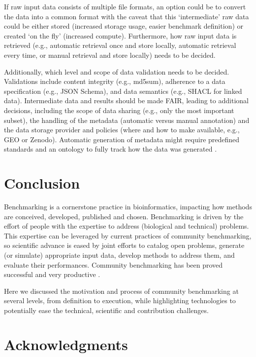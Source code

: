 \documentclass[11pt]{article}
\begin{document}
If raw input data consists of multiple file formats, an option could be to convert the data into a common format with the caveat that this `intermediate' raw data could be either stored (increased storage usage, easier benchmark definition) or created `on the fly' (increased compute). Furthermore, how raw input data is retrieved (e.g., automatic retrieval once and store locally, automatic retrieval every time, or manual retrieval and store locally) needs to be decided.

Additionally, which level and scope of data validation needs to be decided. Validations include content integrity (e.g., md5sum), adherence to a data specification (e.g., JSON Schema), and data semantics (e.g., SHACL for linked data). Intermediate data and results should be made FAIR, leading to additional decisions, including the scope of data sharing (e.g., only the most important subset), the handling of the metadata (automatic versus manual annotation) and the data storage provider and policies (where and how to make available, e.g., GEO or Zenodo). Automatic generation of metadata might require predefined standards and an ontology to fully track how the data was generated \cite{LeboUnknown-om}. 


\section*{Conclusion}
\label{sec:conclusion}

Benchmarking is a cornerstone practice in bioinformatics, impacting how methods are conceived, developed, published and chosen. Benchmarking is driven by the effort of people with the expertise to address (biological and technical) problems. This expertise can be leveraged by current practices of community benchmarking, so scientific advance is eased by joint efforts to catalog open problems, generate (or simulate) appropriate input data, develop methods to address them, and evaluate their performances. Community benchmarking has been proved successful and very productive \cite{Moult2005-ne,Capella-Gutierrez2017-dh,Luecken2024-fk}.

Here we discussed the motivation and process of community benchmarking at several levels, from definition to execution, while highlighting technologies to potentially ease the technical, scientific and contribution challenges. 

\hfill

\section*{Acknowledgments} 
\end{document}
